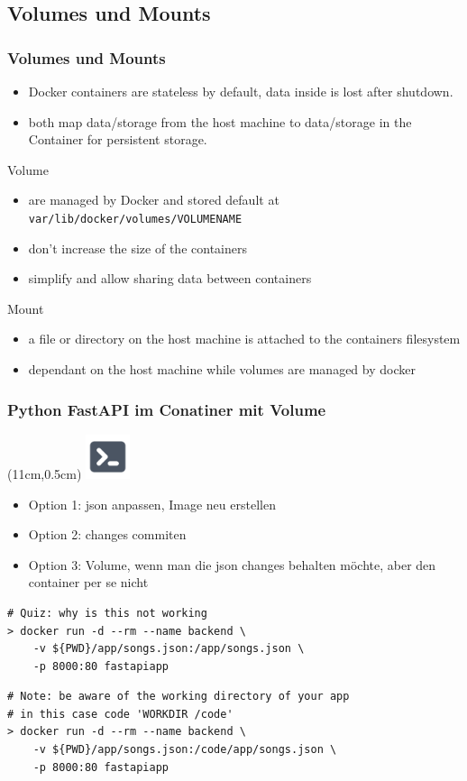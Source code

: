 \documentclass[22pt]{beamer}
\newcommand{\code}[1]{\colorbox{gray!10}{\texttt{#1}}}
\newcommand{\terminal}{
    \begin{textblock*}{1.3cm}(11cm,0.5cm) %
    \includegraphics[width=1.3cm]{Bilder/terminal.png}
    \end{textblock*}
}
\begin{document}
\subsection{Volumes und Mounts}
\begin{frame}[t]
    \frametitle{Volumes und Mounts}
    \begin{itemize}
        \item Docker containers are stateless by default, data inside is lost after shutdown.
        \item both map data/storage from the host machine to data/storage in the Container for persistent storage.
    \end{itemize} \pause
    \begin{block}{Volume}
        \begin{itemize}
            \item are managed by Docker and stored default at \code{var/lib/docker/volumes/VOLUMENAME}
            \item don't increase the size of the containers
            \item simplify and allow sharing data between containers
        \end{itemize}
    \end{block} \pause
    \begin{block}{Mount}
        \begin{itemize}
            \item a file or directory on the host machine is attached to the containers filesystem
            \item dependant on the host machine while volumes are managed by docker
        \end{itemize}
    \end{block}
\end{frame}

\begin{frame}[fragile]
    \frametitle{Python FastAPI im Conatiner mit Volume}
    \terminal
    \begin{itemize}
        \item Option 1: json anpassen, Image neu erstellen
        \item Option 2: changes commiten
        \item Option 3: Volume, wenn man die json changes behalten möchte, aber den container per se nicht
    \end{itemize}

\begin{verbatim}
# Quiz: why is this not working
> docker run -d --rm --name backend \
    -v ${PWD}/app/songs.json:/app/songs.json \
    -p 8000:80 fastapiapp
\end{verbatim}
    \pause
\begin{verbatim}
# Note: be aware of the working directory of your app
# in this case code 'WORKDIR /code'
> docker run -d --rm --name backend \
    -v ${PWD}/app/songs.json:/code/app/songs.json \
    -p 8000:80 fastapiapp    
\end{verbatim}
            
\end{frame}
\end{document}
